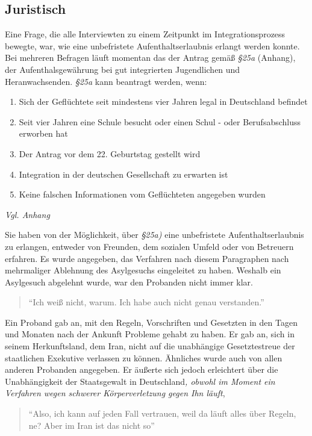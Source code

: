 \subsection{Juristisch}
    
Eine Frage, die alle Interviewten zu einem Zeitpunkt im Integrationsprozess bewegte, war, wie eine unbefristete Aufenthaltserlaubnis erlangt werden konnte. Bei mehreren Befragen läuft momentan das der Antrag gemäß \textit{§25a} (Anhang), der Aufenthalsgewährung bei gut integrierten Jugendlichen und Heranwachsenden.\newline
\textit{§25a} kann beantragt werden, wenn:
    \begin{enumerate}
        \item Sich der Geflüchtete seit mindestens vier Jahren legal in Deutschland befindet
        \item Seit vier Jahren eine Schule besucht oder einen Schul - oder Berufsabschluss erworben hat
        \item Der Antrag vor dem 22. Geburtstag gestellt wird
        \item Integration in der deutschen Gesellschaft zu erwarten ist
        \item Keine falschen Informationen vom Geflüchteten angegeben wurden
    \end{enumerate}
\centerline{\textit{Vgl. Anhang}}
Sie haben von der Möglichkeit, über \textit{§25a)} eine unbefristete Aufenthaltserlaubnis zu erlangen,  entweder von Freunden, dem sozialen Umfeld oder von Betreuern erfahren. Es wurde angegeben, das Verfahren nach diesem Paragraphen nach mehrmaliger Ablehnung des Asylgesuchs eingeleitet zu haben. 
Weshalb ein Asylgesuch abgelehnt wurde, war den Probanden nicht immer klar.
\begin{quote}
    ``Ich weiß nicht, warum. Ich habe auch nicht genau verstanden.''
\end{quote}
Ein Proband gab an, mit den Regeln, Vorschriften und Gesetzten in den Tagen und Monaten nach der Ankunft Probleme gehabt zu haben. Er gab an, sich in seinem Herkunftsland, dem Iran, nicht auf die unabhängige Gesetztestreue der staatlichen Exekutive verlassen zu können. Ähnliches wurde auch von allen anderen Probanden angegeben. Er äußerte sich jedoch erleichtert über die Unabhängigkeit der Staatsgewalt in Deutschland\textit{, obwohl im Moment ein Verfahren wegen schwerer Körperverletzung gegen Ihn läuft},
\begin{quote}
    ``Also, ich kann auf jeden Fall vertrauen, weil da läuft alles über Regeln, ne? Aber im Iran ist das nicht so''
\end{quote}
